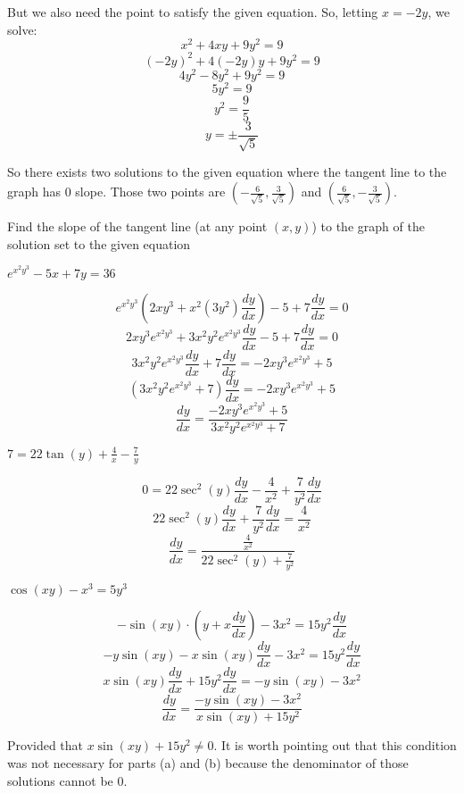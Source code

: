 \documentclass[handout]{ximera}
\newcommand{\dd}[2][]{\frac{d #1}{d #2}}
\renewenvironment{freeResponse}{
\ifhandout\setbox0\vbox\bgroup\else
\begin{trivlist}\item[\hskip \labelsep\bfseries Solution:\hspace{2ex}]
\fi}
{\ifhandout\egroup\else
\end{trivlist}
\fi}
\begin{document}
\begin{problem}
\begin{enumerate}
\begin{freeResponse}
		But we also need the point to satisfy the given equation.  So, letting $x=-2y$, we solve:
		$$x^2 + 4xy + 9y^2 = 9 $$
		$$ (-2y)^2 + 4(-2y)y + 9y^2 = 9 $$
		$$ 4y^2 - 8y^2 + 9y^2 = 9 $$
		$$ 5y^2 = 9 $$
		$$ y^2 = \frac{9}{5} $$
		$$ y = \pm \frac{3}{\sqrt{5}} $$
		
		So there exists two solutions to the given equation where the tangent line to the graph has 0 slope.  Those two points are $\left( -\frac{6}{\sqrt{5}}, \frac{3}{\sqrt{5}} \right)$ and $\left( \frac{6}{\sqrt{5}}, - \frac{3}{\sqrt{5}} \right)$.
		\end{freeResponse}
	\end{enumerate}
\end{problem}

\begin{problem}
Find the slope of the tangent line (at any point $(x,y)$) to the graph of the solution set to the given equation

	\begin{enumerate}
	
	\item  $e^{x^2 y^3} - 5x + 7y = 36$
			\begin{freeResponse}
			$$ e^{x^2 y^3} \left( 2xy^3 + x^2 (3y^2)\dd[y]{x} \right) - 5 + 7\dd[y]{x} = 0 $$
			$$ 2xy^3 e^{x^2y^3} + 3x^2y^2e^{x^2y^3}\dd[y]{x} - 5 + 7\dd[y]{x} = 0 $$
			$$ 3x^2y^2e^{x^2y^3}\dd[y]{x} + 7\dd[y]{x} = -2xy^3 e^{x^2y^3} + 5 $$
			$$ \left( 3x^2y^2e^{x^2y^3} + 7 \right) \dd[y]{x} = -2xy^3 e^{x^2y^3} + 5 $$
			$$  \dd[y]{x} = \frac{-2xy^3 e^{x^2y^3} + 5}{3x^2 y^2 e^{x^2y^3} + 7} $$
			\end{freeResponse}
			
			
			
	\item  $7 = 22 \tan(y) + \frac{4}{x} - \frac{7}{y}$
			\begin{freeResponse}
			$$ 0 = 22 \sec^2 (y) \dd[y]{x} - \frac{4}{x^2} + \frac{7}{y^2} \dd[y]{x} $$
			$$ 22 \sec^2(y) \dd[y]{x} + \frac{7}{y^2} \dd[y]{x} = \frac{4}{x^2} $$
			$$ \dd[y]{x} = \frac{\frac{4}{x^2}}{22 \sec^2(y) + \frac{7}{y^2}} $$
			\end{freeResponse}
			
			
			
	\item  $\cos(xy) - x^3 = 5y^3$
			\begin{freeResponse}
			$$ -\sin(xy) \cdot \left(y + x \dd[y]{x} \right) - 3x^2 = 15y^2 \dd[y]{x} $$
			$$ -y \sin(xy) - x \sin(xy) \dd[y]{x} - 3x^2 = 15y^2 \dd[y]{x} $$
			$$ x \sin(xy) \dd[y]{x} + 15y^2 \dd[y]{x} = -y \sin(xy) - 3x^2 $$
			$$ \dd[y]{x} = \frac{-y \sin(xy) - 3x^2}{x \sin(xy) + 15y^2} $$
			
			Provided that $x \sin(xy) + 15y^2 \neq 0$.  It is worth pointing out that this condition was not necessary for parts (a) and (b) because the denominator of those solutions cannot be $0$.  
			\end{freeResponse}
			
			
			
	\end{enumerate}
\end{problem}
	
\end{document}
